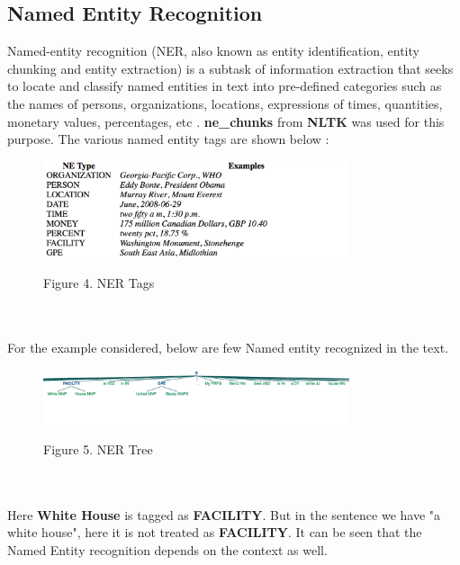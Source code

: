 \documentclass[fleqn,10pt]{SelfArx} %
\begin{document}
\subsection{Named Entity Recognition}
Named-entity recognition (NER, also known as entity identification, entity chunking and entity extraction) is a subtask of information extraction that seeks to locate and classify named entities in text into pre-defined categories such as the names of persons, organizations, locations, expressions of times, quantities, monetary values, percentages, etc \cite{REF:1}.
\textbf{ne\_chunks} from \textbf{NLTK} was used for this purpose. The various named entity tags are shown below \cite{REF:9}: 
\begin{figure}[h]
\begin{minipage}[b]{1.0\linewidth}
  \centering
  \centerline{\includegraphics[width=9cm]{nertags}}
  \centerline{Figure 4. NER Tags}\medskip
\end{minipage}
\end{figure}
\\\\For the example considered, below are few Named entity recognized in the text.
\begin{figure}[h]
\begin{minipage}[b]{1.0\linewidth}
  \centering
  \centerline{\includegraphics[width=9cm]{nertree}}
  \centerline{Figure 5. NER Tree}\medskip
\end{minipage}
\end{figure}
\\\\Here \textbf{White House} is tagged as \textbf{FACILITY}. But in the sentence we have "a white house", here it is not treated as \textbf{FACILITY}. It can be seen that the Named Entity recognition depends on the context as well.
\end{document}
